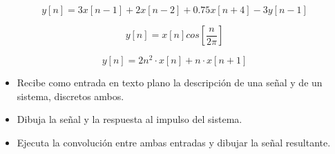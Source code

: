 \documentclass[11pt]{article}
\begin{document}
\begin{question}
\begin{equation}\label{eq:cuatro}
  y[n]=3x[n-1]+2x[n-2]+0.75x[n+4]-3y[n-1]
\end{equation}

\answer{
  \[y[n]+3y[n-1]=3x[n-1]+2x[n-2]+0.75x[n+4]\]
  \[Y[z]+3Y[z]\cdot z^{-1} = 3X[z]\cdot z^{-1}+2X[z]\cdot z^{-2}+0.75X[z]\cdot z^4\]
  \[Y[z]\left(1+\frac{3}{z}\right)=X[z]\left(\frac{3}{z}+\frac{2}{z^{-2}}+0.75z^4\right)\]
  \[\frac{Y[z]}{X[z]}=\frac{3z^{-1}+2z^{-2}+0.75z^4}{1+3z^{-1}}\cdot \frac{z}{z}=\frac{3+2z+0.75z^5}{z+3}\]
}

\begin{equation}\label{eq:cinco}
  y[n]=x[n] cos\left[\frac{n}{2\pi}\right]
\end{equation}

\answer{
  \[Y[z]=X[z] z^0 \cdot \frac{z^2-z\cdot cos\left[\frac{n}{2\pi}\right]}{z^2-2z(cos\left[\frac{n}{2\pi}\right])+1}\]
  \[\frac{Y[z]}{X[z]}=\frac{z^2-z\cdot cos\left[\frac{n}{2\pi}\right]}{z^2-2z(cos\left[\frac{n}{2\pi}\right])+1}\]
}

\begin{equation}\label{eq:seis}
  y[n]=2n^2\cdot x[n] + n\cdot x[n+1]
\end{equation}

\answer{
  \[Y[z]=2n^2 X[z] z^{-0} + nX[z]z^1 = X[z](2n^2+zn)\]
  \[\frac{Y[z]}{X[z]}=2n^2+zn\]
}

\end{question}



\newpage
\begin{question}

  
  \begin{itemize}
  \item{Recibe como entrada en texto plano la descripción de una señal y de un sistema, discretos ambos.}
  \item{Dibuja la señal y la respuesta al impulso del sistema.}
  \item{Ejecuta la convolución entre ambas entradas y dibujar la señal resultante.}
  \end{itemize}

\end{question}
\end{document}
